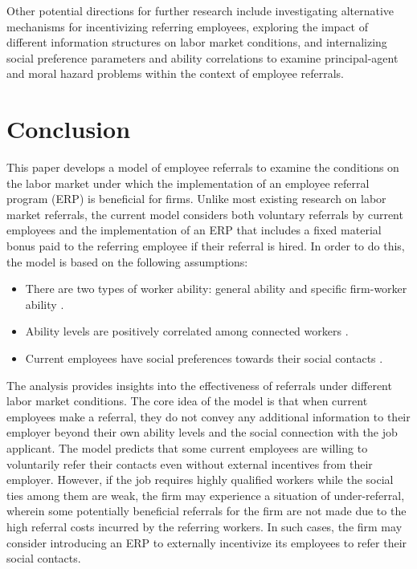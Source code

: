 \documentclass[12pt]{article}
\begin{document}
Other potential directions for further research include investigating alternative mechanisms for incentivizing referring employees, exploring the impact of different information structures on labor market conditions, and internalizing social preference parameters and ability correlations to examine principal-agent and moral hazard problems within the context of employee referrals.

\section{Conclusion} \label{sec:conclusion}

This paper develops a model of employee referrals to examine the conditions on the labor market under which the implementation of an employee referral program (ERP) is beneficial for firms. Unlike most existing research on labor market referrals, the current model considers both voluntary referrals by current employees and the implementation of an ERP that includes a fixed material bonus paid to the referring employee if their referral is hired. In order to do this, the model is based on the following assumptions:
\begin{itemize}
    \item There are two types of worker ability: general ability and specific firm-worker ability \citep{becker1962investment, becker1975investment, gibbons2004task, lazear2009firm}. 
    \item Ability levels are positively correlated among connected workers \citep{montgomery1991social}.
    \item Current employees have social preferences towards their social contacts \citep{bandiera2009social, friebel2023employee}.
\end{itemize}

The analysis provides insights into the effectiveness of referrals under different labor market conditions. The core idea of the model is that when current employees make a referral, they do not convey any additional information to their employer beyond their own ability levels and the social connection with the job applicant. The model predicts that some current employees are willing to voluntarily refer their contacts even without external incentives from their employer. However, if the job requires highly qualified workers while the social ties among them are weak, the firm may experience a situation of under-referral, wherein some potentially beneficial referrals for the firm are not made due to the high referral costs incurred by the referring workers. In such cases, the firm may consider introducing an ERP to externally incentivize its employees to refer their social contacts.
\end{document}
